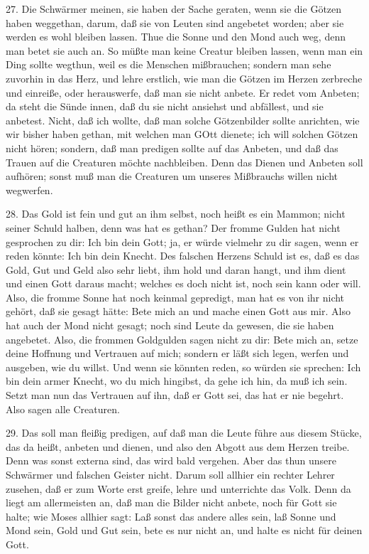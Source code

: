 27. Die Schwärmer meinen, sie haben der Sache geraten, wenn sie die Götzen haben weggethan, darum, daß sie von Leuten sind angebetet worden; aber sie werden es wohl bleiben lassen. Thue die Sonne und den Mond auch weg, denn man betet sie auch an. So müßte man keine Creatur bleiben lassen, wenn man ein Ding sollte wegthun, weil es die Menschen mißbrauchen; sondern man sehe zuvorhin in das Herz, und lehre erstlich, wie man die Götzen im Herzen zerbreche und einreiße, oder herauswerfe, daß man sie nicht anbete. Er redet vom Anbeten; da steht die Sünde innen, daß du sie nicht ansiehst und abfällest, und sie anbetest. Nicht, daß ich wollte, daß man solche Götzenbilder sollte anrichten, wie wir bisher haben gethan, mit welchen man GOtt dienete; ich will solchen Götzen nicht hören; sondern, daß man predigen sollte auf das Anbeten, und daß das Trauen auf die Creaturen möchte nachbleiben. Denn das Dienen und Anbeten soll aufhören; sonst muß man die Creaturen um unseres Mißbrauchs willen nicht wegwerfen.

28. Das Gold ist fein und gut an ihm selbst, noch heißt es ein Mammon; nicht seiner Schuld halben, denn was hat es gethan? Der fromme Gulden hat nicht gesprochen zu dir: Ich bin dein Gott; ja, er würde vielmehr zu dir sagen, wenn er reden könnte: Ich bin dein Knecht. Des falschen Herzens Schuld ist es, daß es das Gold, Gut und Geld also sehr liebt, ihm hold und daran hangt, und ihm dient und einen Gott daraus macht; welches es doch nicht ist, noch sein kann oder will. Also, die fromme Sonne hat noch keinmal gepredigt, man hat es von ihr nicht gehört, daß sie gesagt hätte: Bete mich an und mache einen Gott aus mir. Also hat auch der Mond nicht gesagt; noch sind Leute da gewesen, die sie haben angebetet. Also, die frommen Goldgulden sagen nicht zu dir: Bete mich an, setze deine Hoffnung und Vertrauen auf mich; sondern er läßt sich legen, werfen und ausgeben, wie du willst. Und wenn sie könnten reden, so würden sie sprechen: Ich bin dein armer Knecht, wo du mich hingibst, da gehe ich hin, da muß ich sein. Setzt man nun das Vertrauen auf ihn, daß er Gott sei, das hat er nie begehrt. Also sagen alle Creaturen.

29. Das soll man fleißig predigen, auf daß man die Leute führe aus diesem Stücke, das da heißt, anbeten und dienen, und also den Abgott aus dem Herzen treibe. Denn was sonst externa sind, das wird bald vergehen. Aber das thun unsere Schwärmer und falschen Geister nicht. Darum soll allhier ein rechter Lehrer zusehen, daß er zum Worte erst greife, lehre und unterrichte das Volk. Denn da liegt am allermeisten an, daß man die Bilder nicht anbete, noch für Gott sie halte; wie Moses allhier sagt: Laß sonst das andere alles sein, laß Sonne und Mond sein, Gold und Gut sein, bete es nur nicht an, und halte es nicht für deinen Gott.

